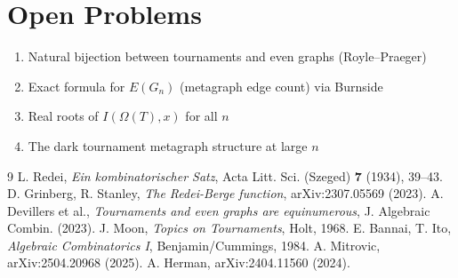 \documentclass[12pt,reqno]{amsart}
\theoremstyle{plain}
\theoremstyle{definition}
\theoremstyle{remark}
\begin{document}
\section{Open Problems}
\begin{enumerate}
\item Natural bijection between tournaments and even graphs (Royle--Praeger)
\item Exact formula for \(E(G_n)\) (metagraph edge count) via Burnside
\item Real roots of \(I(\Omega(T), x)\) for all \(n\)
\item The dark tournament metagraph structure at large \(n\)
\end{enumerate}

\begin{thebibliography}{9}
 L. Redei, \emph{Ein kombinatorischer Satz}, Acta Litt. Sci. (Szeged) \textbf{7} (1934), 39--43.
 D. Grinberg, R. Stanley, \emph{The Redei-Berge function}, arXiv:2307.05569 (2023).
 A. Devillers et al., \emph{Tournaments and even graphs are equinumerous}, J. Algebraic Combin. (2023).
 J. Moon, \emph{Topics on Tournaments}, Holt, 1968.
 E. Bannai, T. Ito, \emph{Algebraic Combinatorics I}, Benjamin/Cummings, 1984.
 A. Mitrovic, arXiv:2504.20968 (2025).
 A. Herman, arXiv:2404.11560 (2024).
\end{thebibliography}
\end{document}
